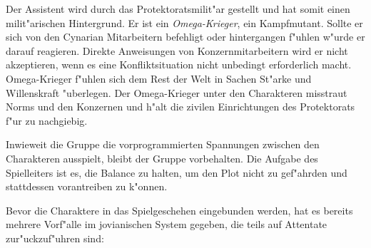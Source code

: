 Der Assistent wird durch das Protektoratsmilit"ar gestellt und hat somit einen milit"arischen Hintergrund. Er ist ein \emph{Omega-Krieger}, ein Kampfmutant. Sollte er sich von den Cynarian Mitarbeitern befehligt oder hintergangen f"uhlen w"urde er darauf reagieren. Direkte Anweisungen von Konzernmitarbeitern wird er nicht akzeptieren, wenn es eine Konfliktsituation nicht unbedingt erforderlich macht. Omega-Krieger f"uhlen sich dem Rest der Welt in Sachen St"arke und Willenskraft "uberlegen. Der Omega-Krieger unter den Charakteren misstraut Norms und den Konzernen und h"alt die zivilen Einrichtungen des Protektorats f"ur zu nachgiebig.

\begin{remarks}
      Inwieweit die Gruppe die vorprogrammierten Spannungen zwischen den Charakteren ausspielt, bleibt der Gruppe vorbehalten. Die Aufgabe des Spielleiters ist es, die Balance zu halten, um den Plot nicht zu gef"ahrden und stattdessen vorantreiben zu k"onnen. 
\end{remarks}      


Bevor die Charaktere in das Spielgeschehen eingebunden werden, hat es bereits mehrere Vorf"alle im jovianischen System gegeben, die teils auf Attentate zur"uckzuf"uhren sind:

